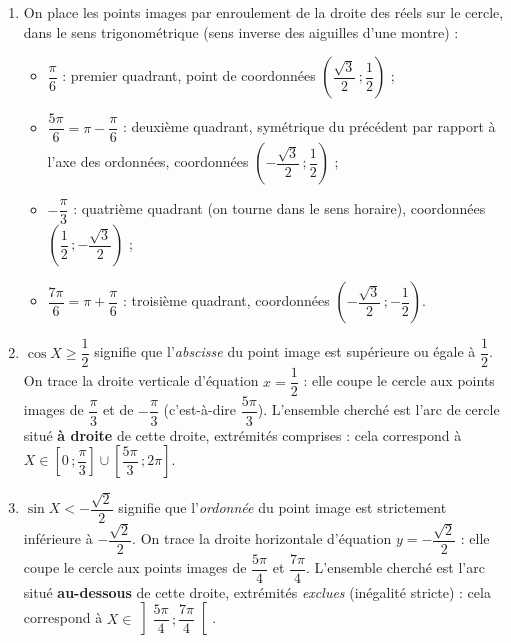 \documentclass[11pt]{article}
\begin{document}
\begin{corrige}
\begin{enumerate}
\item On place les points images par enroulement de la droite des réels sur le cercle, dans le sens trigonométrique (sens inverse des aiguilles d'une montre) :
\begin{itemize}
\item $\dfrac{\pi}{6}$ : premier quadrant, point de coordonnées $\left(\dfrac{\sqrt{3}}{2}\,;\dfrac{1}{2}\right)$ ;
\item $\dfrac{5\pi}{6}=\pi-\dfrac{\pi}{6}$ : deuxième quadrant, symétrique du précédent par rapport à l'axe des ordonnées, coordonnées $\left(-\dfrac{\sqrt{3}}{2}\,;\dfrac{1}{2}\right)$ ;
\item $-\dfrac{\pi}{3}$ : quatrième quadrant (on tourne dans le sens horaire), coordonnées $\left(\dfrac{1}{2}\,;-\dfrac{\sqrt{3}}{2}\right)$ ;
\item $\dfrac{7\pi}{6}=\pi+\dfrac{\pi}{6}$ : troisième quadrant, coordonnées $\left(-\dfrac{\sqrt{3}}{2}\,;-\dfrac{1}{2}\right)$.
\end{itemize}
\item $\cos X\geq \dfrac{1}{2}$ signifie que l'\emph{abscisse} du point image est supérieure ou égale à $\dfrac{1}{2}$. On trace la droite verticale d'équation $x=\dfrac{1}{2}$ : elle coupe le cercle aux points images de $\dfrac{\pi}{3}$ et de $-\dfrac{\pi}{3}$ (c'est-à-dire $\dfrac{5\pi}{3}$). L'ensemble cherché est l'arc de cercle situé \textbf{à droite} de cette droite, extrémités comprises : cela correspond à $X\in\left[0\,;\dfrac{\pi}{3}\right]\cup\left[\dfrac{5\pi}{3}\,;2\pi\right]$.
\item $\sin X<-\dfrac{\sqrt{2}}{2}$ signifie que l'\emph{ordonnée} du point image est strictement inférieure à $-\dfrac{\sqrt{2}}{2}$. On trace la droite horizontale d'équation $y=-\dfrac{\sqrt{2}}{2}$ : elle coupe le cercle aux points images de $\dfrac{5\pi}{4}$ et $\dfrac{7\pi}{4}$. L'ensemble cherché est l'arc situé \textbf{au-dessous} de cette droite, extrémités \emph{exclues} (inégalité stricte) : cela correspond à $X\in\left]\dfrac{5\pi}{4}\,;\dfrac{7\pi}{4}\right[$.
\end{enumerate}
\end{corrige}
\end{document}
